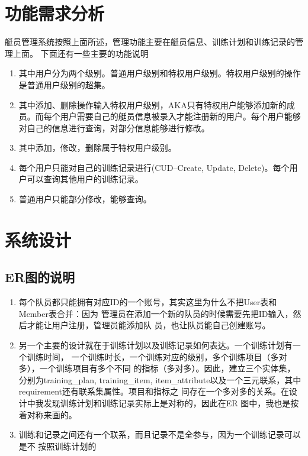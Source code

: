 \section{功能需求分析}
艇员管理系统按照上面所述，管理功能主要在艇员信息、训练计划和训练记录的管理上面。
下面还有一些主要的功能说明
\begin{enumerate}
\item{其中用户分为两个级别。普通用户级别和特权用户级别。特权用户级别的操作是普通用户级别的超集。}

\item{其中添加、删除操作输入特权用户级别，AKA只有特权用户能够添加新的成员。而每个用户需要自己的艇员信息被录入才能注册新的用户。每个用户能够对自己的信息进行查询，对部分信息能够进行修改。}

\item{其中添加，修改，删除属于特权用户级别。}

\item{每个用户只能对自己的训练记录进行(CUD--Create, Update, Delete)。每个用户可以查询其他用户的训练记录。}

\item{普通用户只能部分修改，能够查询。}
\end{enumerate}

\section{系统设计}
\subsection{ER图的说明}
\begin{enumerate}
\item {每个队员都只能拥有对应ID的一个账号，其实这里为什么不把User表和Member表合并：因为
管理员在添加一个新的队员的时候需要先把ID输入，然后才能让用户注册，管理员能添加队
员，也让队员能自己创建账号。
}
\item {另一个主要的设计就在于训练计划以及训练记录如何表达。一个训练计划有一个训练时间，
一个训练时长，一个训练对应的级别，多个训练项目（多对多），一个训练项目有多个不同
的指标（多对多）。因此，建立三个实体集，分别为{training\_plan, training\_item,
  item\_attribute}以及一个三元联系，其中requirement还有联系集属性。项目和指标之
间存在一个多对多的关系。在设计中我发现训练计划和训练记录实际上是对称的，因此在ER
图中，我也是按着对称来画的。}
\item {训练和记录之间还有一个联系，而且记录不是全参与，因为一个训练记录可以是不
    按照训练计划的}
\end{enumerate}


